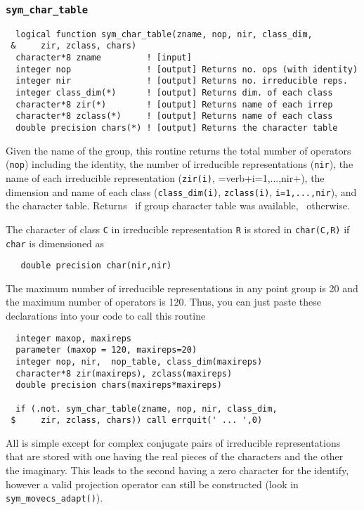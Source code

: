 \subsubsection{{\tt sym\_char\_table}}
\begin{verbatim}
  logical function sym_char_table(zname, nop, nir, class_dim,
 &     zir, zclass, chars)
  character*8 zname         ! [input]
  integer nop               ! [output] Returns no. ops (with identity)
  integer nir               ! [output] Returns no. irreducible reps.
  integer class_dim(*)      ! [output] Returns dim. of each class
  character*8 zir(*)        ! [output] Returns name of each irrep
  character*8 zclass(*)     ! [output] Returns name of each class
  double precision chars(*) ! [output] Returns the character table
\end{verbatim}
Given the name of the group, this routine returns the
total number of operators (\verb+nop+) including the identity, the
number of irreducible representations (\verb+nir+), the name of each
irreducible representation (\verb+zir(i)+, =verb+i=1,...,nir+), the
dimension and name of each class (\verb+class_dim(i)+,
\verb+zclass(i)+, \verb+i=1,...,nir+), and the character table.  
Returns \TRUE\ if group character table was available, \FALSE\ 
otherwise.

The character of class \verb+C+ in irreducible representation \verb+R+
is stored in \verb+char(C,R)+ if \verb+char+ is dimensioned as
\begin{verbatim}
   double precision char(nir,nir)
\end{verbatim}
The maximum number of irreducible representations in any point group
is 20 and the maximum number of operators is 120.  Thus, you can just
paste these declarations into your code to call this routine
\begin{verbatim}
  integer maxop, maxireps     
  parameter (maxop = 120, maxireps=20)
  integer nop, nir,  nop_table, class_dim(maxireps)
  character*8 zir(maxireps), zclass(maxireps)
  double precision chars(maxireps*maxireps)

  if (.not. sym_char_table(zname, nop, nir, class_dim,
 $     zir, zclass, chars)) call errquit(' ... ',0)
\end{verbatim}

All is simple except for complex conjugate pairs of irreducible
representations that are stored with one having the real pieces of the
characters and the other the imaginary.  This leads to the second
having a zero character for the identify, however a valid projection
operator can still be constructed (look in \verb+sym_movecs_adapt()+).

